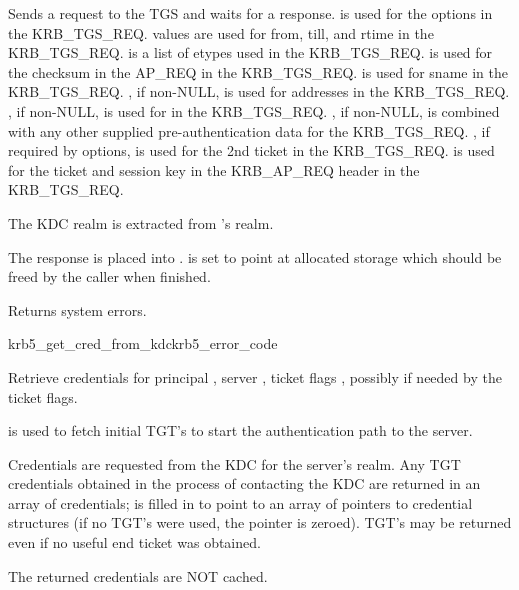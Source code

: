 \internalfunc

Sends a request to the TGS and waits for a response.
 is used for the options in the KRB_TGS_REQ.
 values are used for from, till, and rtime in the
KRB_TGS_REQ.
 is a list of etypes used in the KRB_TGS_REQ.
 is used for the checksum in the AP_REQ in the KRB_TGS_REQ.
 is used for sname in the KRB_TGS_REQ.
, if non-NULL, is used for addresses in the KRB_TGS_REQ.
, if non-NULL, is used for
 in the KRB_TGS_REQ.  
, if non-NULL, is combined with any other supplied
pre-authentication data for the KRB_TGS_REQ.
, if required by options, is used for the 2nd
ticket in the KRB_TGS_REQ.
 is used for the ticket and session key in the KRB_AP_REQ header in the KRB_TGS_REQ.

The KDC realm is extracted from 's realm.

The response is placed into .
 is set to point at allocated storage
which should be freed by the caller when finished.

Returns system errors.

\begin{funcdecl}{krb5_get_cred_from_kdc}{krb5_error_code}{\funcin}
\funcinout
{}
\funcout			
{}
\end{funcdecl}

Retrieve credentials for principal ,
server ,
ticket flags , possibly
 if needed by the ticket flags.

 is used to fetch initial TGT's to start the authentication
path to the server.

Credentials are requested from the KDC for the server's realm.  Any
TGT credentials obtained in the process of contacting the KDC are
returned in an array of credentials;  is filled in to
point to an array of pointers to credential structures (if no TGT's were
used, the pointer is zeroed).  TGT's may be returned even if no useful
end ticket was obtained.

The returned credentials are NOT cached.

